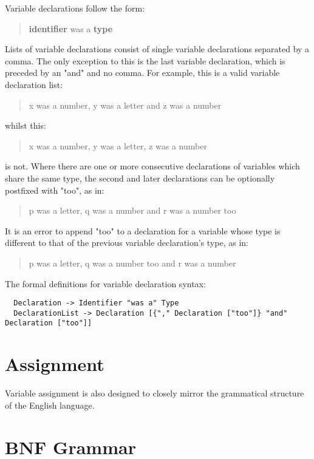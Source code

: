 \documentclass[a4wide, 11pt]{article}
\begin{document}
Variable declarations follow the form:

\begin{quote}
\textbf{identifier} was a \textbf{type}
\end{quote}

Lists of variable declarations consist of single variable declarations separated by a comma. The only exception to this is the last variable declaration, which is preceded by an "and" and no comma. For example, this is a valid variable declaration list:

\begin{quote}
x was a number, y was a letter and z was a number
\end{quote}

whilst this:

\begin{quote}
x was a number, y was a letter, z was a number
\end{quote}

is not. Where there are one or more consecutive declarations of variables which share the same type, the second and later declarations can be optionally postfixed with "too", as in:

\begin{quote}
p was a letter, q was a number and r was a number too
\end{quote}

It is an error to append "too" to a declaration for a variable whose type is different to that of the previous variable declaration's type, as in:

\begin{quote}
p was a letter, q was a number too and r was a number
\end{quote}

The formal definitions for variable declaration syntax:

\begin{verbatim}
  Declaration -> Identifier "was a" Type
  DeclarationList -> Declaration [{"," Declaration ["too"]} "and" Declaration ["too"]]
\end{verbatim}

\section{Assignment}

Variable assignment is also designed to closely mirror the grammatical structure of the English language.

\section{BNF Grammar} 
\end{document}
